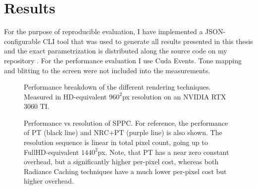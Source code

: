 
\chapter{Results}
\label{chap:results}
For the purpose of reproducible evaluation, I have implemented a JSON-configurable CLI tool that was used to generate all results presented in this thesis and the exact parametrization is distributed along the source code on my repository \parencite{stamm2025}.
For the performance evaluation I use Cuda Events.
Tone mapping and blitting to the screen were not included into the measurements.

\begin{figure}
    \centering
    
    \caption{Performance breakdown of the different rendering techniques. Measured in HD-equivalent $960^2$px resolution on an NVIDIA RTX 3060 TI.}
    \label{fig:breakdown}
\end{figure}

\begin{figure}
    \centering
    
    \caption{Performance vs resolution of SPPC. For reference, the performance of PT (black line) and NRC+PT (purple line) is also shown. The resolution sequence is linear in total pixel count, going up to FullHD-equivalent $1440^2$px. Note, that PT has a near zero constant overhead, but a significantly higher per-pixel cost, whereas both Radiance Caching techniques have a much lower per-pixel cost but higher overhead.}
    \label{fig:perres}
\end{figure}